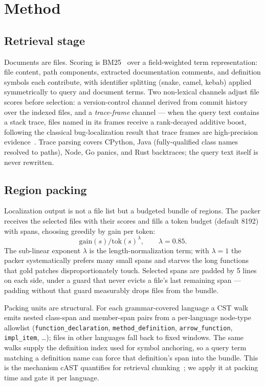 \documentclass[11pt]{article}
\begin{document}
\section{Method}
\label{sec:method}

\subsection{Retrieval stage}
Documents are files. Scoring is BM25~\cite{bm25} over a field-weighted term
representation: file content, path components, extracted documentation
comments, and definition symbols each contribute, with identifier splitting
(snake, camel, kebab) applied symmetrically to query and document terms. Two
non-lexical channels adjust file scores before selection: a version-control
channel derived from commit history over the indexed files, and a
\emph{trace-frame} channel --- when the query text contains a stack trace,
files named in its frames receive a rank-decayed additive boost, following the
classical bug-localization result that trace frames are high-precision
evidence~\cite{brtracer}. Trace parsing covers CPython, Java (fully-qualified
class names resolved to paths), Node, Go panics, and Rust backtraces; the
query text itself is never rewritten.

\subsection{Region packing}
Localization output is not a file list but a budgeted bundle of regions. The
packer receives the selected files with their scores and fills a token budget
(default 8192) with spans, choosing greedily by gain per token:
\[
  \text{gain}(s) / \text{tok}(s)^{\lambda}, \qquad \lambda = 0.85 .
\]
The sub-linear exponent $\lambda$ is the length-normalization term; with
$\lambda = 1$ the packer systematically prefers many small spans and starves
the long functions that gold patches disproportionately touch. Selected spans
are padded by 5 lines on each side, under a guard that never evicts a file's
last remaining span --- padding without that guard measurably drops files from
the bundle.

Packing units are structural. For each grammar-covered language a CST walk
emits nested class-span and member-span pairs from a per-language node-type
allowlist (\texttt{function\_declaration}, \texttt{method\_definition},
\texttt{arrow\_function}, \texttt{impl\_item}, \dots); files in other
languages fall back to fixed windows. The same walks supply the definition
index used for symbol anchoring, so a query term matching a definition name
can force that definition's span into the bundle. This is the mechanism cAST
quantifies for retrieval chunking~\cite{cast}; we apply it at packing time and
gate it per language.
\end{document}
